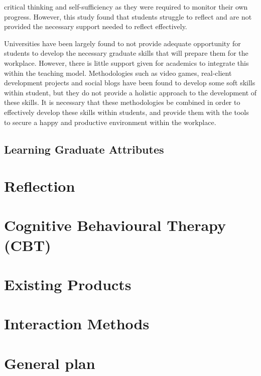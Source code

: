 \documentclass{l4proj}
\begin{document}
critical thinking and self-sufficiency as they were required to monitor their own progress. 
However, this study found that students struggle to reflect and are not provided the necessary 
support needed to reflect effectively. 
\par 
Universities have been largely found to not provide adequate opportunity for students to 
develop the necessary graduate skills that will prepare them for the workplace. However, there is 
little support given for academics to integrate this within the teaching model. Methodologies such 
as video games, real-client development projects and social blogs have been found to develop some 
soft skills within student, but they do not provide a holistic approach to the development of 
these skills. It is necessary that these methodologies be combined in order to effectively 
develop these skills within students, and provide them with the tools to secure a happy and 
productive environment within the workplace.

\subsection{Learning Graduate Attributes}

\section{Reflection}

\section{Cognitive Behavioural Therapy (CBT)}

\section{Existing Products}

\section{Interaction Methods}

\section{}

\section{General plan}
\end{document}
